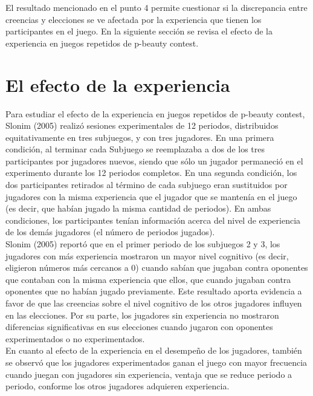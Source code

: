 El resultado mencionado en el punto 4 permite cuestionar si la discrepancia entre creencias y elecciones se ve afectada por la experiencia que tienen los participantes en el juego.  En la siguiente sección se revisa el efecto de la experiencia en juegos repetidos de p-beauty contest.\\

\section{El efecto de la experiencia}

Para estudiar el efecto de la experiencia en juegos repetidos de p-beauty contest, Slonim (2005) realizó sesiones experimentales de 12 periodos, distribuidos equitativamente en tres subjuegos, y con tres jugadores.
En una primera condición, al terminar cada Subjuego se reemplazaba a dos de los tres participantes por jugadores nuevos, siendo que sólo un jugador permaneció en el experimento durante los 12 periodos completos. En una segunda condición, los dos participantes retirados al término de cada subjuego eran sustituidos por jugadores con la misma experiencia que el jugador que se mantenía en el juego (es decir, que habían jugado la misma cantidad de periodos). En ambas condiciones, los participantes tenían información acerca del nivel de experiencia de los demás jugadores (el número de periodos jugados).\\

Slonim (2005) reportó que en el primer periodo de los subjuegos 2 y 3, los jugadores con más experiencia mostraron un mayor nivel cognitivo (es decir, eligieron números más cercanos a 0) cuando sabían que jugaban contra oponentes que contaban con la misma experiencia que ellos, que cuando jugaban contra oponentes que no habían jugado previamente. Este resultado aporta evidencia a favor de que las creencias sobre el nivel cognitivo de los otros jugadores influyen en las elecciones. Por su parte, los jugadores sin experiencia no mostraron diferencias signiﬁcativas en sus elecciones cuando jugaron con oponentes experimentados o no experimentados.\\

En cuanto al efecto de la experiencia en el desempeño de los jugadores, también se observó que los jugadores experimentados ganan el juego con mayor frecuencia cuando juegan con jugadores sin experiencia, ventaja que se reduce periodo a periodo, conforme los otros jugadores adquieren experiencia.\\

